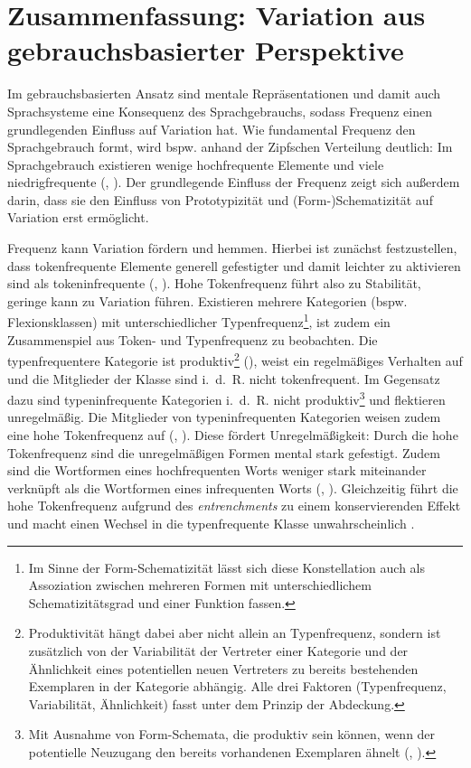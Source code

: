 \section{Zusammenfassung: Variation aus gebrauchsbasierter Perspektive}\label{zusvar}
\begin{sloppypar}
Im gebrauchsbasierten Ansatz sind mentale Repräsentationen und damit auch Sprachsysteme eine Konsequenz des Sprachgebrauchs, sodass Frequenz einen grundlegenden Einfluss auf Variation hat. Wie fundamental Frequenz den Sprachgebrauch formt, wird bspw. anhand der Zipfschen Verteilung deutlich: Im Sprachgebrauch existieren wenige hochfrequente Elemente und viele niedrigfrequente (\cite[22--27]{Zipf.1972}, \cite[13]{Ellis.2012}). Der grundlegende Einfluss der Frequenz zeigt sich außerdem darin, dass sie den Einfluss von Prototypizität und (Form-)\-Schematizität auf Variation erst ermöglicht.
\end{sloppypar}
 

Frequenz kann Variation fördern und hemmen. Hierbei ist zunächst festzustellen, dass tokenfrequente Elemente generell gefestigter und damit leichter zu aktivieren sind als tokeninfrequente (\cite[380]{Bybee.1997}, \cite[13]{Schneider.2014}). Hohe Tokenfrequenz führt also zu Stabilität, geringe kann zu Variation führen. Existieren mehrere Kategorien (bspw. Flexionsklassen) mit unterschiedlicher Typenfrequenz\footnote{Im Sinne der Form-Schematizität lässt sich diese Konstellation auch als Assoziation zwischen mehreren Formen mit unterschiedlichem Schematizitätsgrad und einer Funktion fassen.}, ist zudem ein Zusammenspiel aus Token- und Typenfrequenz zu beobachten. Die typenfrequentere Kategorie ist produktiv\footnote{Produktivität hängt dabei aber nicht allein an Typenfrequenz, sondern ist zusätzlich von der Variabilität der Vertreter einer Kategorie und der Ähnlichkeit eines potentiellen neuen Vertreters zu bereits bestehenden Exemplaren in der Kategorie abhängig. Alle drei Faktoren (Typenfrequenz, Variabilität, Ähnlichkeit) fasst \textcite[62--63]{Goldberg.2019} unter dem Prinzip der Abdeckung.} (\cite[384]{Bybee.1997}), weist ein regelmäßiges Verhalten auf und die Mitglieder der Klasse sind i.~d.~R. nicht tokenfrequent. Im Gegensatz dazu sind typeninfrequente Kategorien i.~d.~R. nicht produktiv\footnote{Mit Ausnahme von Form-Schemata, die produktiv sein können, wenn der potentielle Neuzugang den bereits vorhandenen Exemplaren ähnelt (\cite[6]{Bybee.2010}, \cite[62--63]{Goldberg.2019}).} und flektieren unregelmäßig. Die Mitglieder von typeninfrequenten Kategorien weisen zudem eine hohe Tokenfrequenz auf (\cite[380]{Bybee.1997}, \cite[166]{Ellis.2002b}). Diese fördert Unregelmäßigkeit: Durch die hohe Tokenfrequenz sind die unregelmäßigen Formen mental stark gefestigt. Zudem sind die Wortformen eines hochfrequenten Worts weniger stark miteinander verknüpft als die Wortformen eines infrequenten Worts (\cite[117--118]{Bybee.1985}, \cite[715]{Bybee.2006b}). Gleichzeitig führt die hohe Tokenfrequenz aufgrund des \textit{entrenchments} zu einem konservierenden Effekt und macht einen Wechsel in die typenfrequente Klasse unwahrscheinlich \parencites[117]{Bybee.1985}[619--621]{Bybee.2002}. 



